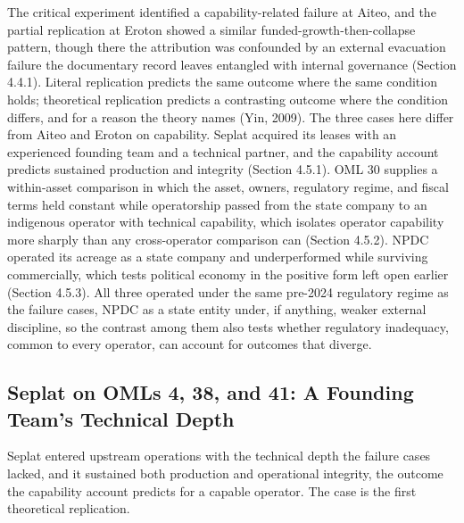 \documentclass[twoside,fontset=lmodern]{mitthesis}
\begin{document}
The critical experiment identified a capability-related failure at
Aiteo, and the partial replication at Eroton showed a similar
funded-growth-then-collapse pattern, though there the attribution was
confounded by an external evacuation failure the documentary record
leaves entangled with internal governance (Section 4.4.1). Literal
replication predicts the same outcome where the same condition holds;
theoretical replication predicts a contrasting outcome where the
condition differs, and for a reason the theory names (Yin, 2009). The
three cases here differ from Aiteo and Eroton on capability. Seplat
acquired its leases with an experienced founding team and a technical
partner, and the capability account predicts sustained production and
integrity (Section 4.5.1). OML 30 supplies a within-asset comparison in
which the asset, owners, regulatory regime, and fiscal terms held
constant while operatorship passed from the state company to an
indigenous operator with technical capability, which isolates operator
capability more sharply than any cross-operator comparison can (Section
4.5.2). NPDC operated its acreage as a state company and underperformed
while surviving commercially, which tests political economy in the
positive form left open earlier (Section 4.5.3). All three operated
under the same pre-2024 regulatory regime as the failure cases, NPDC as
a state entity under, if anything, weaker external discipline, so the
contrast among them also tests whether regulatory inadequacy, common to
every operator, can account for outcomes that diverge.

\hypertarget{seplat-on-omls-4-38-and-41-a-founding-teams-technical-depth}{%
\subsection{Seplat on OMLs 4, 38, and 41: A Founding Team's Technical
Depth}\label{seplat-on-omls-4-38-and-41-a-founding-teams-technical-depth}}

Seplat entered upstream operations with the technical depth the failure
cases lacked, and it sustained both production and operational
integrity, the outcome the capability account predicts for a capable
operator. The case is the first theoretical replication.
\end{document}
